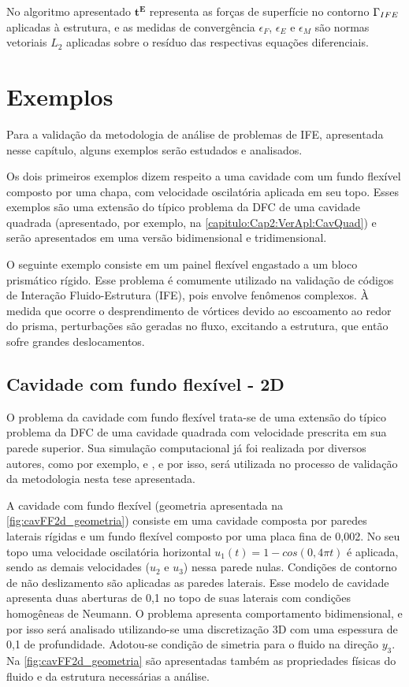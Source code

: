 No algoritmo apresentado $\boldsymbol{t^{E}}$ representa as forças de superfície no contorno $\Gamma_{IFE}$ aplicadas à estrutura, e as medidas de convergência $\epsilon_F$, $\epsilon_E$ e $\epsilon_M$ são normas vetoriais $L_2$ aplicadas sobre o resíduo das respectivas equações diferenciais.

\section{Exemplos}

Para a validação da metodologia de análise de problemas de IFE, apresentada nesse capítulo, alguns exemplos serão estudados e analisados.

Os dois primeiros exemplos dizem respeito a uma cavidade com um fundo flexível composto por uma chapa, com velocidade oscilatória aplicada em seu topo. Esses exemplos são uma extensão do típico problema da DFC de uma cavidade quadrada (apresentado, por exemplo, na \autoref{capitulo:Cap2:VerApl:CavQuad}) e serão apresentados em uma versão bidimensional e tridimensional.

O seguinte exemplo consiste em um painel flexível engastado a um bloco prismático rígido. Esse problema é comumente utilizado na validação de códigos de Interação Fluido-Estrutura (IFE), pois envolve fenômenos complexos. À medida que ocorre o desprendimento de vórtices devido ao escoamento ao redor do prisma, perturbações são geradas no fluxo, excitando a estrutura, que então sofre grandes deslocamentos.

\subsection{Cavidade com fundo flexível - 2D}

O problema da cavidade com fundo flexível trata-se de uma extensão do típico problema da DFC de uma cavidade quadrada com velocidade prescrita em sua parede superior. Sua simulação computacional já foi realizada por diversos autores, como por exemplo,  e , e  por isso, será utilizada no processo de validação da metodologia nesta tese apresentada.

A cavidade com fundo flexível (geometria apresentada na \autoref{fig:cavFF2d_geometria}) consiste em uma cavidade composta por paredes laterais rígidas e um fundo flexível composto por uma placa fina de 0,002. No seu topo uma velocidade oscilatória horizontal $u_1(t)=1-cos(0,4 \pi t)$ é aplicada, sendo as demais velocidades ($u_2$ e $u_3$) nessa parede nulas. Condições de contorno de não deslizamento são aplicadas as paredes laterais. Esse modelo de cavidade apresenta duas aberturas de 0,1 no topo de suas laterais com condições homogêneas de Neumann. O problema apresenta comportamento bidimensional, e por isso será analisado utilizando-se uma discretização 3D com uma espessura de 0,1 de profundidade. Adotou-se condição de simetria para o fluido na direção $y_3$.  Na \autoref{fig:cavFF2d_geometria} são apresentadas também as propriedades físicas do fluido e da estrutura necessárias a análise.

